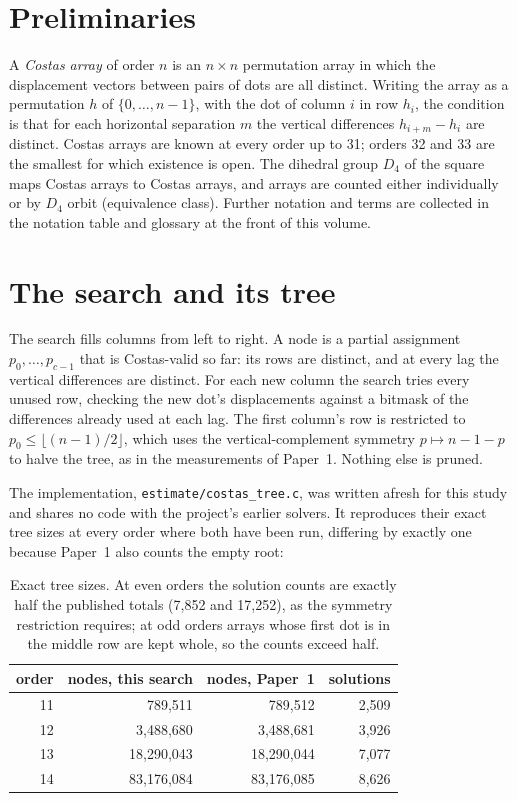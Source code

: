 \documentclass[11pt,a4paper,oneside]{report}
\theoremstyle{definition}
\begin{document}
\section{Preliminaries}\label{p9-sec:notation}
A \emph{Costas array} of order $n$ is an $n\times n$ permutation array in which the displacement
vectors between pairs of dots are all distinct. Writing the array as a permutation $h$ of
$\{0,\dots,n-1\}$, with the dot of column $i$ in row $h_i$, the condition is that for each
horizontal separation $m$ the vertical differences $h_{i+m}-h_i$ are distinct. Costas arrays are
known at every order up to 31; orders 32 and 33 are the smallest for which existence is open. The
dihedral group $D_4$ of the square maps Costas arrays to Costas arrays, and arrays are counted
either individually or by $D_4$ orbit (equivalence class). Further notation and terms are collected
in the notation table and glossary at the front of this volume.

\section{The search and its tree}
\label{p9-sec:tree}
The search fills columns from left to right. A node is a partial assignment $p_0,\dots,p_{c-1}$ that is
Costas-valid so far: its rows are distinct, and at every lag the vertical differences are distinct. For
each new column the search tries every unused row, checking the new dot's displacements against a
bitmask of the differences already used at each lag. The first column's row is restricted to
$p_0\le\lfloor(n-1)/2\rfloor$, which uses the vertical-complement symmetry $p\mapsto n-1-p$ to halve the
tree, as in the measurements of Paper~1. Nothing else is pruned.

The implementation, \texttt{estimate/costas\_tree.c}, was written afresh for this study and shares no code
with the project's earlier solvers. It reproduces their exact tree sizes at every order where both have
been run, differing by exactly one because Paper~1 also counts the empty root:

\begin{table}[H]
\centering
\small
\begin{tabular}{@{}rrrr@{}}
\toprule
order & nodes, this search & nodes, Paper~1 & solutions \\
\midrule
11 & 789{,}511 & 789{,}512 & 2{,}509 \\
12 & 3{,}488{,}680 & 3{,}488{,}681 & 3{,}926 \\
13 & 18{,}290{,}043 & 18{,}290{,}044 & 7{,}077 \\
14 & 83{,}176{,}084 & 83{,}176{,}085 & 8{,}626 \\
\bottomrule
\end{tabular}
\caption{Exact tree sizes. At even orders the solution counts are exactly half the published totals
(7{,}852 and 17{,}252), as the symmetry restriction requires; at odd orders arrays whose first dot is in
the middle row are kept whole, so the counts exceed half.}
\label{p9-tab:exact}
\end{table}
\end{document}
